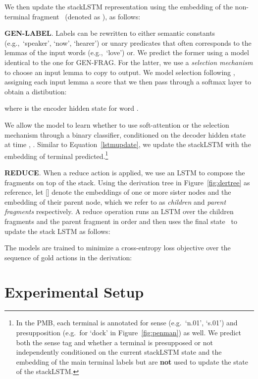 \documentclass[11pt,a4paper]{article}
\theoremstyle{plain}
\begin{document}
We then update the stackLSTM representation using the embedding of the
non-terminal fragment~ (denoted as ), as follows:


\textbf{GEN-LABEL}. Labels  can be rewritten to either semantic constants (e.g.,~`speaker', `now',
`hearer') or unary predicates that often corresponds to the lemmas of the input words (e.g.,~`love')
or. We predict the former using a model identical to the 
one for GEN-FRAG. For the latter, we use a \textit{selection mechanism} to
choose an input lemma to copy to output. We model selection
following \citet{liu2018discourse}, assigning each
input lemma a score  that we then pass
through a softmax layer to obtain a distibution:


where  is the encoder hidden state for word .

We allow the model to learn whether to use soft-attention or the
selection mechanism through a binary classifier, conditioned on the
decoder hidden state at time , . Similar to Equation~\eqref{lstmupdate}, we update the
stackLSTM with the embedding of terminal predicted.\footnote{In the PMB, each terminal is annotated for sense (e.g.~`n.01', `s.01') and presupposition (e.g.~for `dock' in Figure~\ref{fig:penman}) as well. We predict both the sense tag and whether a terminal is presupposed or not independently conditioned on the current stackLSTM state and the embedding of the main terminal labels but are \textbf{not} used to update the state of the stackLSTM.}

\textbf{REDUCE}. When a reduce action is applied, we
use an LSTM to compose the fragments on top of the stack. Using the
derivation tree in Figure~\ref{fig:dertree} as reference, let
[] denote the embeddings of one or more sister nodes  and  the embedding of their parent node, which we refer to as \textit{children} and \textit{parent fragments} respectively. A
reduce operation runs an LSTM over the children fragments and the
parent fragment in order and then uses the final state~ to update
the stack LSTM as follows:


The models are trained to minimize a cross-entropy loss objective  over the sequence of gold actions  in the derivation:


\section{Experimental Setup}
\label{sec:experimental-setup}
\end{document}
